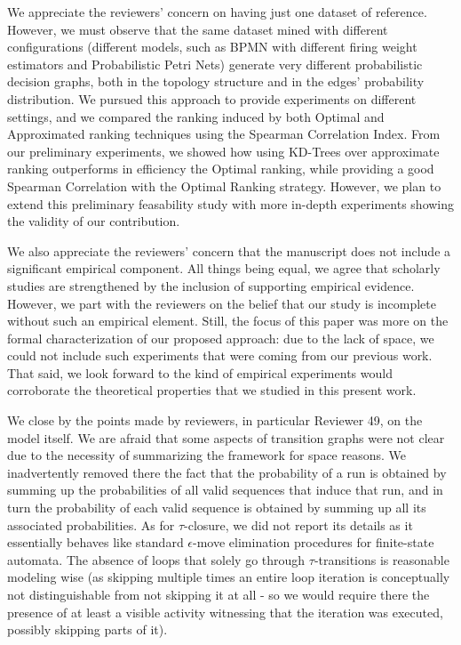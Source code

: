 \documentclass{article}
\begin{document}
We appreciate the reviewers' concern on having just one dataset of reference. However, we must observe that the same dataset mined with different configurations (different models, such as BPMN with different firing weight estimators and Probabilistic Petri Nets) generate very different probabilistic decision graphs, both in the topology structure and in the edges' probability distribution. We pursued this approach to provide experiments on different settings, and we compared the ranking induced by both Optimal and Approximated ranking techniques using the Spearman Correlation Index. From our preliminary experiments, we showed how using KD-Trees over approximate ranking outperforms in efficiency the Optimal ranking, while providing a good Spearman Correlation with the Optimal Ranking strategy. However, we plan to extend this preliminary feasability study with more in-depth experiments showing the validity of our contribution.

We also appreciate the reviewers' concern that the manuscript does not include a significant empirical component. All things being equal, we agree that scholarly studies are strengthened by the inclusion of supporting empirical evidence. However, we part with the reviewers on the belief that our study is incomplete without such an empirical element. Still, the focus of this paper was more on the formal characterization of our proposed approach: due to the lack of space, we could not include such experiments that were coming from our previous work. That said, we look forward to the kind of empirical experiments would corroborate the theoretical properties that we studied in this present work.

We close by the points made by reviewers, in particular Reviewer 49, on the model itself. We are afraid that some aspects of transition graphs were not clear due to the necessity of summarizing the framework for space reasons. We inadvertently removed there the fact that the probability of a run is obtained by summing up the probabilities of all valid sequences that induce that run, and in turn the probability of each valid sequence is obtained by summing up all its associated probabilities. As for $\tau$-closure, we did not report its details as it essentially behaves like standard $\epsilon$-move elimination procedures for finite-state automata. The absence of loops that solely go through $\tau$-transitions is reasonable modeling wise (as skipping multiple times an entire loop iteration is conceptually not distinguishable from not skipping it at all - so we would require there the presence of at least a visible activity witnessing that the iteration was executed, possibly skipping parts of it).
\end{document}
